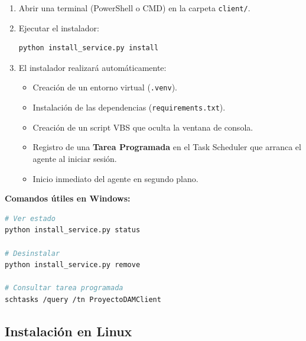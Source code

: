 \documentclass[12pt,a4paper]{article}
\begin{document}
\begin{enumerate}
    \item Abrir una terminal (PowerShell o CMD) en la carpeta \texttt{client/}.
    \item Ejecutar el instalador:

\begin{lstlisting}[language=bash]
python install_service.py install
\end{lstlisting}

    \item El instalador realizará automáticamente:
    \begin{itemize}
        \item Creación de un entorno virtual (\texttt{.venv}).
        \item Instalación de las dependencias (\texttt{requirements.txt}).
        \item Creación de un script VBS que oculta la ventana de consola.
        \item Registro de una \textbf{Tarea Programada} en el Task Scheduler que arranca el agente al iniciar sesión.
        \item Inicio inmediato del agente en segundo plano.
    \end{itemize}
\end{enumerate}

\textbf{Comandos útiles en Windows:}

\begin{lstlisting}[language=bash]
# Ver estado
python install_service.py status

# Desinstalar
python install_service.py remove

# Consultar tarea programada
schtasks /query /tn ProyectoDAMClient
\end{lstlisting}

\subsection{Instalación en Linux}
\end{document}
